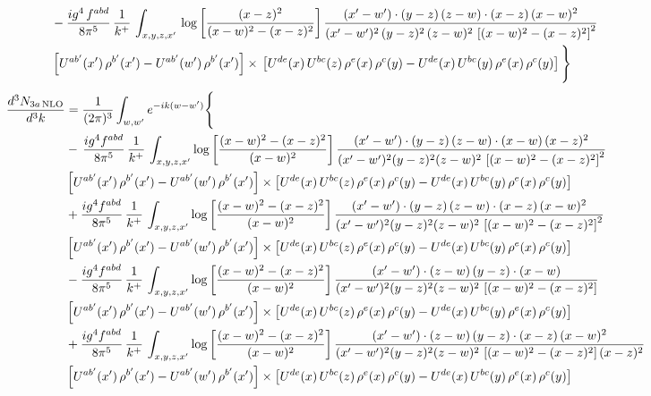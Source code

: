 \documentclass[9pt]{article}
\numberwithin{equation}{section}
\begin{document}
\begin{align}
& -\frac{ig^{4}\, f^{abd}}{8\pi^{5}}\, \frac{1}{k^{+}}\, \int_{x,y,z,x'}\,\log{\left[\frac{(x-z)^{2}}{(x-w)^{2}-(x-z)^{2}}\right]}\,\frac{(x'-w')\cdot (y-z)\, (z-w)\cdot (x-z)\,(x-w)^{2}}{(x'-w')^{2}\, (y-z)^{2}\, (z-w)^{2}\,\left[(x-w)^{2}-(x-z)^{2}\right]^{2}}\, \notag \\ & \left[U^{ab'}(x')\,\rho^{b'}(x')-U^{ab'}(w')\, \rho^{b'}(x')\right]\times\,\left[U^{de}(x)\,U^{bc}(z)\, \rho^{e}(x)\,\rho^{c}(y)-U^{de}(x)\,U^{bc}(y)\,\rho^{e}(x)\,\rho^{c}(y)\right]\Bigg\}
\end{align}
\begin{align}
\frac{d^{3}N_{3a\,\rm NLO}}{d^{3}k} & = \frac{1}{(2\pi)^{3}}\int_{w,w'}e^{-ik(w-w')}\Bigg\{\notag \\
& -\,\frac{ig^{4}f^{abd}}{8\pi^{5}}\,\frac{1}{k^{+}}\,\int_{x,y,z,x'}\log{\left[\frac{(x-w)^{2}-(x-z)^{2}}{(x-w)^{2}}\right]}\,
\frac{(x'-w')\cdot(y-z)\,(z-w)\cdot(x-w)\,(x-z)^{2}}{(x'-w')^{2}(y-z)^{2}(z-w)^{2}\,\left[(x-w)^{2}-(x-z)^{2}\right]^{2}}\notag \\ & \left[U^{ab'}(x')\,\rho^{b'}(x')-U^{ab'}(w')\, \rho^{b'}(x')\right]\times \left[U^{de}(x)\,U^{bc}(z)\, \rho^{e}(x)\,\rho^{c}(y)-U^{de}(x)\,U^{bc}(y)\,\rho^{e}(x)\,\rho^{c}(y)\right] \notag \\
& +\frac{ig^{4}f^{abd}}{8\pi^{5}}\,\frac{1}{k^{+}}\,\int_{x,y,z,x'}\log{\left[\frac{(x-w)^{2}-(x-z)^{2}}{(x-w)^{2}}\right]}\,
\frac{(x'-w')\cdot(y-z)\,(z-w)\cdot(x-z)\,(x-w)^{2}}{(x'-w')^{2}(y-z)^{2}(z-w)^{2}\,\left[(x-w)^{2}-(x-z)^{2}\right]^{2}}\notag \\ 
&\left[U^{ab'}(x')\,\rho^{b'}(x')-U^{ab'}(w')\, \rho^{b'}(x')\right]\times \left[U^{de}(x)\,U^{bc}(z)\, \rho^{e}(x)\,\rho^{c}(y)-U^{de}(x)\,U^{bc}(y)\,\rho^{e}(x)\,\rho^{c}(y)\right] \notag \\
& -\frac{ig^{4}f^{abd}}{8\pi^{5}}\,\frac{1}{k^{+}}\,\int_{x,y,z,x'}\log{\left[\frac{(x-w)^{2}-(x-z)^{2}}{(x-w)^{2}}\right]}\,
\frac{(x'-w')\cdot(z-w)\,(y-z)\cdot(x-w)}{(x'-w')^{2}(y-z)^{2}(z-w)^{2}\,\left[(x-w)^{2}-(x-z)^{2}\right]}\notag \\ & \left[U^{ab'}(x')\,\rho^{b'}(x')-U^{ab'}(w')\, \rho^{b'}(x')\right]\times \left[U^{de}(x)\,U^{bc}(z)\, \rho^{e}(x)\,\rho^{c}(y)-U^{de}(x)\,U^{bc}(y)\,\rho^{e}(x)\,\rho^{c}(y)\right] \notag \\
&  +\frac{ig^{4}f^{abd}}{8\pi^{5}}\,\frac{1}{k^{+}}\,\int_{x,y,z,x'}\log{\left[\frac{(x-w)^{2}-(x-z)^{2}}{(x-w)^{2}}\right]}\,
\frac{(x'-w')\cdot(z-w)\,(y-z)\cdot(x-z)\,(x-w)^{2}}{(x'-w')^{2}(y-z)^{2}(z-w)^{2}\,\left[(x-w)^{2}-(x-z)^{2}\right](x-z)^{2}}\notag \\ & \left[U^{ab'}(x')\,\rho^{b'}(x')-U^{ab'}(w')\, \rho^{b'}(x')\right]\times \left[U^{de}(x)\,U^{bc}(z)\, \rho^{e}(x)\,\rho^{c}(y)-U^{de}(x)\,U^{bc}(y)\,\rho^{e}(x)\,\rho^{c}(y)\right] \notag \\

\end{align}
\end{document}
